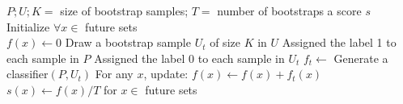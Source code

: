 \documentclass{article}
\begin{document}
\begin{algorithm}[!h]
\renewcommand{\algorithmicrequire}{\textbf{Input:}} %
\renewcommand{\algorithmicensure}{\textbf{Output:}} %
	\caption{Bagging PU} %
	\begin{algorithmic}[1] %
	    \REQUIRE
	    $P;U;K=$ size of bootstrap samples; $T=$ number of bootstraps
	    \ENSURE
	    a score $s$ \\
	    Initialize $\forall x\in$ future sets \\
	    \STATE $f(x) \leftarrow 0$ 
		\STATE Draw a bootstrap sample $U_t$ of size $K$ in $U$
		\STATE Assigned the label 1 to each sample in $P$
		\STATE Assigned the label 0 to each sample in $U_t$
		\STATE $f_t\leftarrow$ Generate a classifier$(P,U_t)$
		\STATE For any $x$, update:
		\STATE $f(x)\leftarrow f(x)+f_t(x)$
		\ENDFOR
		\RETURN $s(x)\leftarrow f(x)/T$ for $x\in$ future sets \\
	\end{algorithmic}
\end{algorithm}
\end{document}
